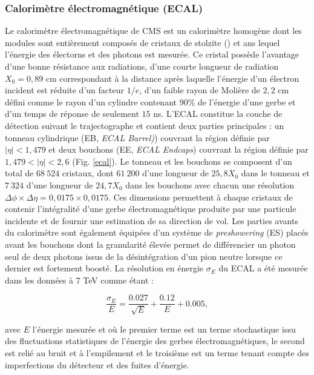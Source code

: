 \subsubsection{ Calorimètre électromagnétique (ECAL)}

Le calorimètre électromagnétique de CMS est un calorimètre homogène dont les modules sont entièrement composés de cristaux de stolzite () et ans lequel l'énergie des électorns et des photons est mesurée. Ce cristal possède l'avantage d'une bonne résistance aux radiations, d'une courte longueur de radiation $X_0=0,89$ cm correspondant à la distance après laquelle l'énergie d'un électron incident est réduite d'un facteur $1/e$, d'un faible rayon de Molière de $2,2$ cm défini comme le rayon d'un cylindre contenant $90\%$ de l'énergie d'une gerbe et d'un temps de réponse de seulement $15$ ns. L'ECAL constitue la couche de détection suivant le trajectographe et contient deux parties principales : un tonneau cylindrique (EB, \textit{ECAL Barrel)}) couvrant la région définie par $|\eta|<1,479$ et deux bouchons (EE, \textit{ECAL Endcaps}) couvrant la région définie par $1,479<|\eta|<2,6$ (Fig. \ref{ecal}). Le tonneau et les bouchons se composent d'un total de $68~524$ cristaux, dont $61~200$ d'une longueur de $25,8X_0$ dans le tonneau et $7~324$ d'une longueur de $24,7X_0$ dans les bouchons avec chacun une résolution $\Delta\phi\times\Delta\eta=0,0175\times0,0175$. Ces dimensions permettent à chaque cristaux de contenir l'intégralité d'une gerbe électromagnétique produite par une particule incidente et de fournir une estimation de sa direction de vol. Les parties avants du calorimètre sont également équipées d'un système de \textit{preshowering} (ES) placés avant les bouchons dont la granularité élevée permet de différencier un photon seul de deux photons issus de la désintégration d'un pion neutre lorsque ce dernier est fortement boosté. La résolution en énergie $\sigma_E$ du ECAL a été mesurée dans les données à $7$ TeV \cite{ECALres} comme étant :

\begin{equation}
    \frac{\sigma_E}{E}=\frac{0.027}{\sqrt{E}}+\frac{0.12}{E}+0.005,
\end{equation}

avec $E$ l'énergie mesurée et où le premier terme est un terme stochastique issu des fluctuations statistiques de l'énergie des gerbes électromagnétiques, le second est relié au bruit et à l'empilement et le troisième est un terme tenant compte des imperfections du détecteur et des fuites d'énergie.

